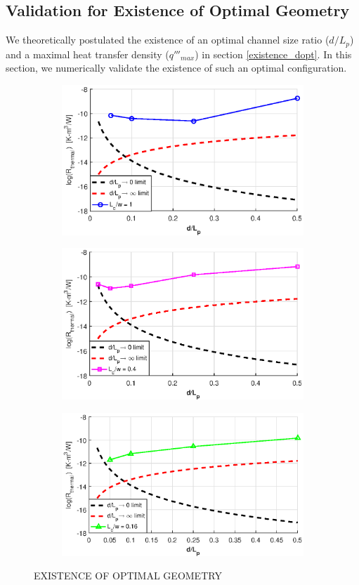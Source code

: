 \documentclass[twocolumn,10pt,cleanfoot]{ihmtc}
\begin{document}
\subsection{Validation for Existence of Optimal Geometry}\label{optgeo}
We theoretically postulated the existence of an optimal channel size ratio ($d/L_p$) and a maximal heat transfer density ($q'''_{max}$) in section \ref{existence_dopt}. In this section, we numerically validate the existence of such an optimal configuration. 
%
\begin{figure}
\centering
   \begin{subfigure}[b]{0.55\textwidth}
   \includegraphics[width=0.85\linewidth]{Rmin_a.eps}
   \caption{}
   \label{Rmin_a} 
\end{subfigure}
%
   \begin{subfigure}[b]{0.55\textwidth}
   \includegraphics[width=0.85\linewidth]{Rmin_b.eps}
   \caption{}
   \label{Rmin_b} 
\end{subfigure}
%
%
   \begin{subfigure}[b]{0.55\textwidth}
   \includegraphics[width=0.85\linewidth]{Rmin_c.eps}
   \caption{}
   \label{Rmin_c} 
\end{subfigure}
%
\caption{EXISTENCE OF OPTIMAL GEOMETRY}
\vspace{-3em}
\end{figure}
\end{document}
